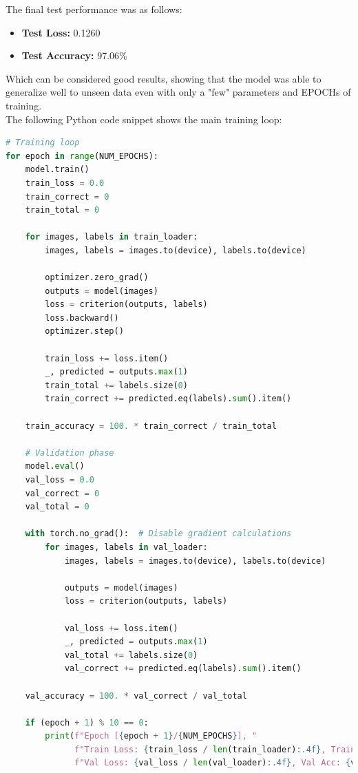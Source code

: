\documentclass{article}
\begin{document}
The final test performance was as follows:
\begin{itemize}
    \item \textbf{Test Loss:} 0.1260
    \item \textbf{Test Accuracy:} 97.06\%
\end{itemize}

Which can be considered good results, showing that the model was able to generalize well to unseen data even with only a "few" parameters and EPOCHs of training.\\

The following Python code snippet shows the main training loop:

\begin{lstlisting}[language=Python]
# Training loop
for epoch in range(NUM_EPOCHS):
    model.train()
    train_loss = 0.0
    train_correct = 0
    train_total = 0

    for images, labels in train_loader:
        images, labels = images.to(device), labels.to(device)

        optimizer.zero_grad()
        outputs = model(images)
        loss = criterion(outputs, labels)
        loss.backward()
        optimizer.step()

        train_loss += loss.item()
        _, predicted = outputs.max(1)
        train_total += labels.size(0)
        train_correct += predicted.eq(labels).sum().item()

    train_accuracy = 100. * train_correct / train_total

    # Validation phase
    model.eval()
    val_loss = 0.0
    val_correct = 0
    val_total = 0

    with torch.no_grad():  # Disable gradient calculations
        for images, labels in val_loader:
            images, labels = images.to(device), labels.to(device)

            outputs = model(images)
            loss = criterion(outputs, labels)

            val_loss += loss.item()
            _, predicted = outputs.max(1)
            val_total += labels.size(0)
            val_correct += predicted.eq(labels).sum().item()

    val_accuracy = 100. * val_correct / val_total

    if (epoch + 1) % 10 == 0:
        print(f"Epoch [{epoch + 1}/{NUM_EPOCHS}], "
              f"Train Loss: {train_loss / len(train_loader):.4f}, Train Acc: {train_accuracy:.2f}%, "
              f"Val Loss: {val_loss / len(val_loader):.4f}, Val Acc: {val_accuracy:.2f}%")
\end{lstlisting}
\end{document}

